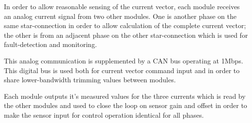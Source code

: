 In order to allow reasonable sensing of the current vector, each module
receives an analog current signal from two other modules.  One is another
phase on the same star-connection in order to allow calculation of the
complete current vector; the other is from an adjacent phase on the other
star-connection which is used for fault-detection and monitoring.

This analog communication is supplemented by a CAN bus operating at 1Mbps.
This digital bus is used both for current vector command input and in order to
share lower-bandwidth trimming values between modules.

Each module outputs it's measured values for the three currents which is read
by the other modules and used to close the loop on sensor gain and offset in
order to make the sensor input for control operation identical for all phases.
